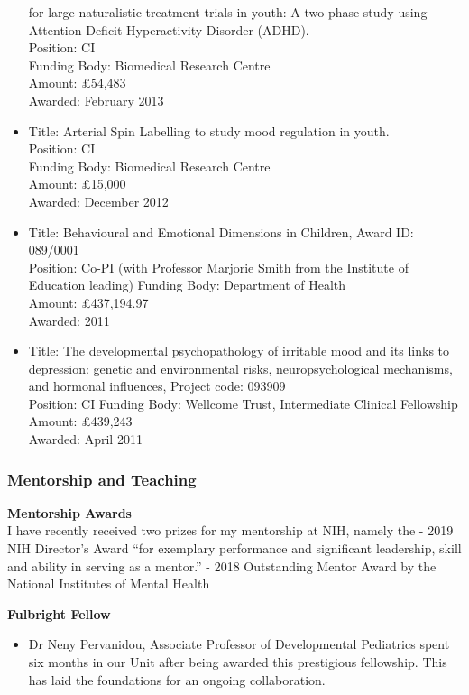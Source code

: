 \documentclass[
]{article}
\providecommand{\tightlist}{%
  \setlength{\itemsep}{0pt}\setlength{\parskip}{0pt}}
\begin{document}
\begin{itemize}
  for large naturalistic treatment trials in youth: A two-phase study
  using Attention Deficit Hyperactivity Disorder (ADHD).\\
  Position: CI\\
  Funding Body: Biomedical Research Centre\\
  Amount: £54,483\\
  Awarded: February 2013
\item
  Title: Arterial Spin Labelling to study mood regulation in youth.\\
  Position: CI\\
  Funding Body: Biomedical Research Centre\\
  Amount: £15,000\\
  Awarded: December 2012
\item
  Title: Behavioural and Emotional Dimensions in Children, Award ID:
  089/0001\\
  Position: Co-PI (with Professor Marjorie Smith from the Institute of
  Education leading) Funding Body: Department of Health\\
  Amount: £437,194.97\\
  Awarded: 2011
\item
  Title: The developmental psychopathology of irritable mood and its
  links to depression: genetic and environmental risks,
  neuropsychological mechanisms, and hormonal influences, Project code:
  093909\\
  Position: CI Funding Body: Wellcome Trust, Intermediate Clinical
  Fellowship\\
  Amount: £439,243\\
  Awarded: April 2011
\end{itemize}

\hypertarget{mentorship-and-teaching}{%
\subsubsection{Mentorship and Teaching}\label{mentorship-and-teaching}}

\textbf{Mentorship Awards}\\
I have recently received two prizes for my mentorship at NIH, namely the
- 2019 NIH Director's Award ``for exemplary performance and significant
leadership, skill and ability in serving as a mentor.'' - 2018
Outstanding Mentor Award by the National Institutes of Mental Health

\textbf{Fulbright Fellow}

\begin{itemize}
\tightlist
\item
  Dr Neny Pervanidou, Associate Professor of Developmental Pediatrics
  spent six months in our Unit after being awarded this prestigious
  fellowship. This has laid the foundations for an ongoing
  collaboration.
\end{itemize}
\end{document}

